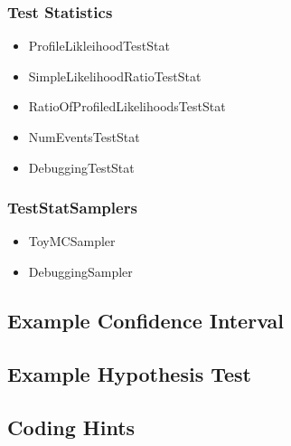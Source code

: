\documentclass[11pt]{article}
\begin{document}
\subsubsection{Test Statistics}
\begin{itemize}
 \item ProfileLikleihoodTestStat
 \item SimpleLikelihoodRatioTestStat
 \item RatioOfProfiledLikelihoodsTestStat
 \item NumEventsTestStat
 \item DebuggingTestStat
\end{itemize}

\subsubsection{TestStatSamplers}
\begin{itemize}
 \item ToyMCSampler
 \item DebuggingSampler
\end{itemize}

\subsection{Example Confidence Interval}

\newpage





\subsection{Example Hypothesis Test}

\subsection{Coding Hints}
\end{document}
